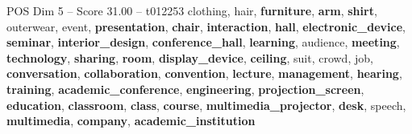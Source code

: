 \begin{textsample}{POS Dim 5 – Score 31.00 – t012253}  \label{ex:f5_pos_017}
clothing, hair, \textbf{furniture}, \textbf{arm}, \textbf{shirt}, outerwear, event, \textbf{presentation}, \textbf{chair}, \textbf{interaction}, \textbf{hall}, \textbf{electronic\_device}, \textbf{seminar}, \textbf{interior\_design}, \textbf{conference\_hall}, \textbf{learning}, audience, \textbf{meeting}, \textbf{technology}, \textbf{sharing}, \textbf{room}, \textbf{display\_device}, \textbf{ceiling}, suit, crowd, job, \textbf{conversation}, \textbf{collaboration}, \textbf{convention}, \textbf{lecture}, \textbf{management}, \textbf{hearing}, \textbf{training}, \textbf{academic\_conference}, \textbf{engineering}, \textbf{projection\_screen}, \textbf{education}, \textbf{classroom}, \textbf{class}, \textbf{course}, \textbf{multimedia\_projector}, \textbf{desk}, speech, \textbf{multimedia}, \textbf{company}, \textbf{academic\_institution}

\end{textsample}
